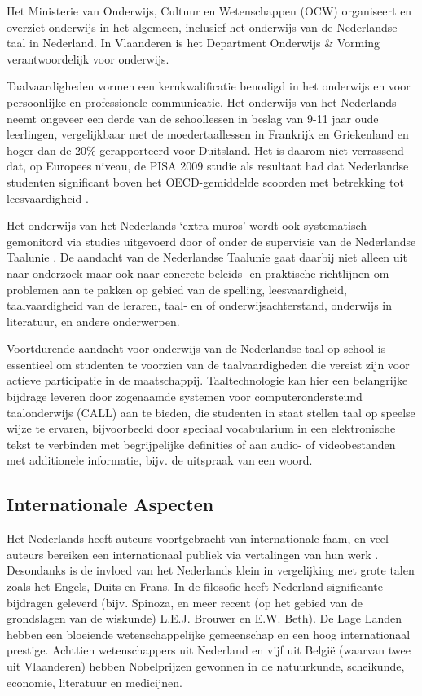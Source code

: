 \begin{multicols}{2}
    Het Ministerie van Onderwijs, Cultuur en Wetenschappen (OCW) organiseert en overziet onderwijs in het algemeen, inclusief het onderwijs van de Nederlandse taal in Nederland. In Vlaanderen is het Department Onderwijs \& Vorming verantwoordelijk voor onderwijs.

    Taalvaardigheden vormen een kernkwalificatie benodigd in het onderwijs en voor persoonlijke en professionele communicatie. Het onderwijs van het Nederlands neemt ongeveer een derde van de schoollessen in beslag van 9-11 jaar oude leerlingen, vergelijkbaar met de moedertaallessen in Frankrijk en Griekenland en hoger dan de 20\% gerapporteerd voor Duitsland. Het is daarom niet verrassend dat, op Europees niveau, de PISA 2009 studie als resultaat had dat Nederlandse studenten significant boven het OECD-gemiddelde scoorden met betrekking tot leesvaardigheid \cite{Dataoecd}.

    Het onderwijs van het Nederlands `extra muros' wordt ook systematisch gemonitord via studies uitgevoerd door of onder de supervisie van de Nederlandse Taalunie \cite{NTUOnderwijs}.  De aandacht van de Nederlandse Taalunie gaat daarbij niet alleen uit naar onderzoek maar ook naar concrete beleids- en praktische richtlijnen om problemen aan te pakken op gebied van de spelling, leesvaardigheid, taalvaardigheid van de leraren, taal- en of onderwijsachterstand, onderwijs in literatuur, en andere onderwerpen.

    Voortdurende aandacht voor onderwijs van de Nederlandse taal op school is essentieel om studenten te voorzien van de taalvaardigheden die vereist zijn voor actieve participatie in de maatschappij. Taaltechnologie kan hier een belangrijke bijdrage leveren door zogenaamde systemen voor computerondersteund taalonderwijs (CALL) aan te bieden, die studenten in staat stellen taal op speelse wijze te ervaren, bijvoorbeeld door speciaal vocabularium in een elektronische tekst te verbinden met begrijpelijke definities of aan audio- of videobestanden met additionele informatie, bijv. de uitspraak van een woord.

\subsection{Internationale Aspecten}

    Het Nederlands heeft auteurs voortgebracht van internationale faam, en veel auteurs bereiken een internationaal publiek via vertalingen van hun werk \cite{Vertalingendb}.   Desondanks is de invloed van het Nederlands klein in vergelijking met grote talen zoals het Engels, Duits en Frans. In de filosofie heeft Nederland significante bijdragen geleverd (bijv. Spinoza, en meer recent (op het gebied van de grondslagen van de wiskunde) L.E.J. Brouwer en E.W. Beth). De Lage Landen hebben een bloeiende wetenschappelijke gemeenschap en een hoog internationaal prestige. Achttien wetenschappers uit Nederland en vijf uit Belgi{\"e} (waarvan twee uit Vlaanderen) hebben Nobelprijzen gewonnen in de natuurkunde, scheikunde, economie, literatuur en medicijnen.


\end{multicols}
